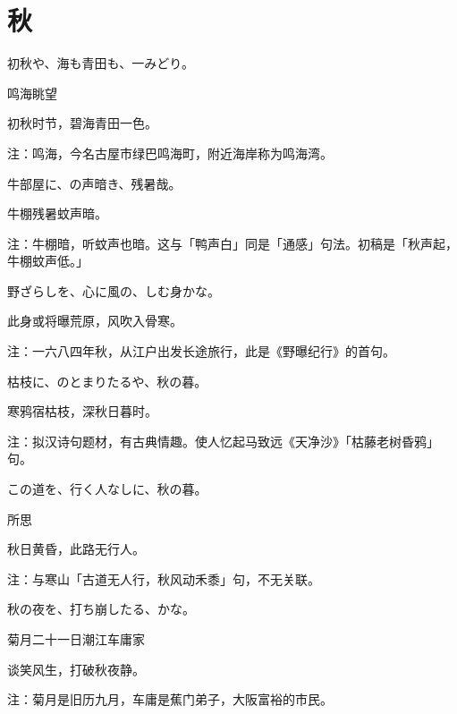 \section{\FK 秋}

\setcounter{haikucounter}{0}

\begin{haiku}
    {\FH 初秋や、海も青田も、一みどり。}

    {\FK 鸣海眺望}

    {\FK 初秋时节，碧海青田一色。}

    {\FT 注：鸣海，今名古屋市绿巴鸣海町，附近海岸称为鸣海湾。}
\end{haiku}

\begin{haiku}
    {\FH 牛部屋に、の声暗き、残暑哉。}

    {\FK 牛棚残暑蚊声暗。}

    {\FT 注：牛棚暗，听蚊声也暗。这与「鸭声白」同是「通感」句法。初稿是「秋声起，牛棚蚊声低。」}
\end{haiku}

\begin{haiku}
    {\FH 野ざらしを、心に風の、しむ身かな。}

    {\FK 此身或将曝荒原，风吹入骨寒。}

    {\FT 注：一六八四年秋，从江户出发长途旅行，此是《野曝纪行》的首句。}
\end{haiku}

\begin{haiku}
    {\FH 枯枝に、のとまりたるや、秋の暮。}

    {\FK 寒鸦宿枯枝，深秋日暮时。}

    {\FT 注：拟汉诗句题材，有古典情趣。使人忆起马致远《天净沙》「枯藤老树昏鸦」句。}
\end{haiku}

\begin{haiku}
    {\FH この道を、行く人なしに、秋の暮。}

    {\FK 所思}

    {\FK 秋日黄昏，此路无行人。}

    {\FT 注：与寒山「古道无人行，秋风动禾黍」句，不无关联。}
\end{haiku}

\begin{haiku}
    {\FH 秋の夜を、打ち崩したる、かな。}

    {\FK 菊月二十一日潮江车庸家}

    {\FK 谈笑风生，打破秋夜静。}

    {\FT 注：菊月是旧历九月，车庸是蕉门弟子，大阪富裕的市民。}
\end{haiku}

